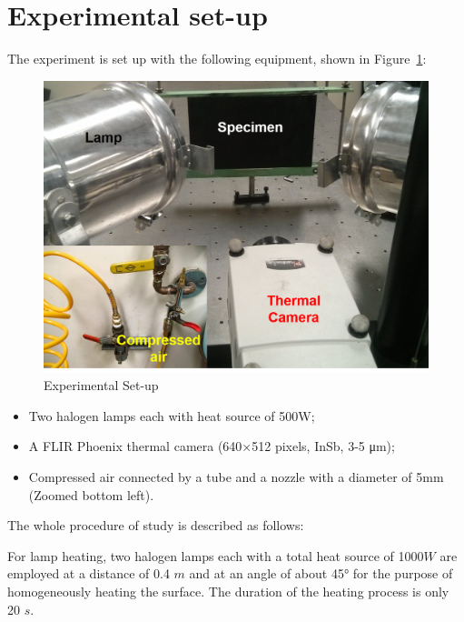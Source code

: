 \documentclass{tQRT2e}
\begin{document}
\section{Experimental set-up}
The experiment is set up with the following equipment, shown in Figure~\ref{Exp}:
\begin{figure}
	\centering
	\includegraphics[scale=0.5]{Exp}
	\caption{Experimental Set-up}
	\label{Exp}
\end{figure}

\begin{itemize}
  \item Two halogen lamps each with heat source of 500W;
  \item A FLIR Phoenix thermal camera (640×512 pixels, InSb, 3-5 μm);
  \item Compressed air connected by a tube and a nozzle with a diameter of 5mm (Zoomed bottom left).
\end{itemize}

The whole procedure of study is described as follows:  

For lamp heating, two halogen lamps each with a total heat source of 1000$ W $ are employed at a distance of 0.4 $ m $ and at an angle of about 45° for the purpose of homogeneously heating the surface. The duration of the heating process is only 20 $ s $.   
\end{document}
